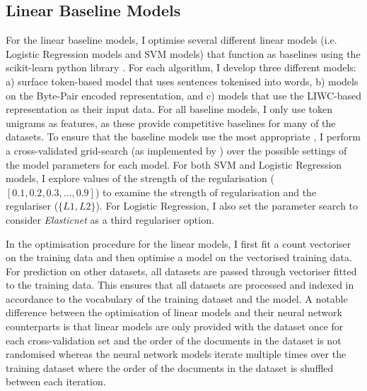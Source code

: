 \subsection{Linear Baseline Models}\label{sec:baseline_models}  
For the linear baseline models, I optimise several different linear models (i.e. Logistic Regression models and SVM models) that function as baselines using the scikit-learn python library \citet{Pedregosa:2011}.  
For each algorithm, I develop three different models: a) surface token-based model that uses sentences tokenised into words, b) models on the Byte-Pair encoded representation, and c) models that use the LIWC-based representation as their input data.  
For all baseline models, I only use token unigrams as features, as these provide competitive baselines for many of the datasets.  
To ensure that the baseline models use the most appropriate , I perform a cross-validated grid-search (as implemented by \citet{Pedregosa:2011}) over the possible settings of the model parameters for each model.  
For both SVM and Logistic Regression models, I explore values of the strength of the regularisation ($[0.1, 0.2, 0.3, \ldots, 0.9]$) to examine the strength of regularisation and the regulariser ($\{L1, L2\}$).  
For Logistic Regression, I also set the parameter search to consider \textit{Elasticnet} as a third regulariser option.  
  
In the optimisation procedure for the linear models, I first fit a count vectoriser on the training data and then optimise a model on the vectorised training data.  
For prediction on other datasets, all datasets are passed through vectoriser  fitted to the training data.  
This ensures that all datasets are processed and indexed in accordance to the vocabulary of the training dataset and the model.  
A notable difference between the optimisation of linear models and their neural network counterparts is that linear models are only provided with the dataset once for each cross-validation set and the order of the documents in the dataset is not randomised whereas the neural network models iterate multiple times over the training dataset where the order of the documents in the dataset is  shuffled between each iteration.  
  
